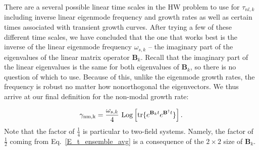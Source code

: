\documentclass[letter,scriptaddress,twocolumn, prl,showkeys]{revtex4}
\def\beq{\begin{equation}}
\def\eeq{\end{equation}}
\begin{document}
There are a several possible linear time scales in the HW problem to use for $\tau_{nl,k}$ 
including inverse linear eigenmode frequency and growth rates as well as certain times associated with transient growth curves. 
After trying a few of these different time scales, we have concluded that the one that works best is the inverse of the linear eigenmode frequency $\omega_{s,k}$
-- the imaginary part of the eigenvalues of the linear matrix operator $\mathbf{B}_k$.
Recall that the imaginary part of the linear eigenvalues is the same for both eigenvalues of $\mathbf{B}_k$, so there is no question of which to use. Because of this, unlike the eigenmode growth rates,
the frequency is robust no matter how nonorthogonal the eigenvectors. We thus arrive at our final definition for the non-modal growth rate:

\beq
\label{gamma_omega_def}
\gamma_{\rm{nm},k} = \frac{\omega_{s,k}}{4} \ {\rm{Log}} \left[ {\rm{tr}} \{ e^{\mathbf{B}_k t} e^{\mathbf{B}^{\dagger}t} \} \right].
\eeq
Note that the factor of $\frac{1}{4}$ is particular to two-field systems. Namely, the factor of $\frac{1}{2}$ coming from Eq.~\ref{E_t_ensemble_avg} is a consequence of the $2 \times 2$ size
of $\mathbf{B}_k$.
\end{document}
